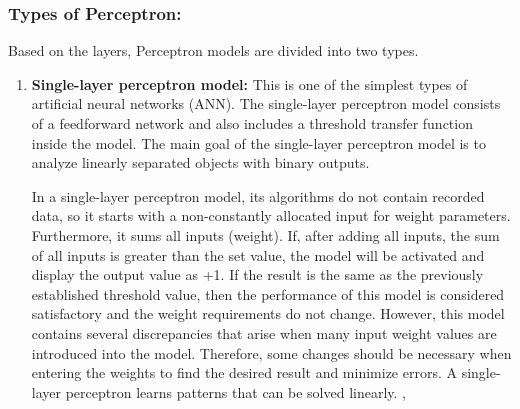 \subsubsection{Types of Perceptron: }
Based on the layers, Perceptron models are divided into two types.
\begin{enumerate}
    \item \textbf{Single-layer perceptron model:}  This is one of the simplest types of artificial neural networks (ANN). The single-layer perceptron model consists of a feedforward network and also includes a threshold transfer function inside the model. The main goal of the single-layer perceptron model is to analyze linearly separated objects with binary outputs.

    In a single-layer perceptron model, its algorithms do not contain recorded data, so it starts with a non-constantly allocated input for weight parameters. Furthermore, it sums all inputs (weight). If, after adding all inputs, the sum of all inputs is greater than the set value, the model will be activated and display the output value as +1.
    If the result is the same as the previously established threshold value, then the performance of this model is considered satisfactory and the weight requirements do not change. However, this model contains several discrepancies that arise when many input weight values are introduced into the model. Therefore, some changes should be necessary when entering the weights to find the desired result and minimize errors.
    A single-layer perceptron learns patterns that can be solved linearly. \cite{ansari2020building}, \cite{knerr1990single}


\end{enumerate}
